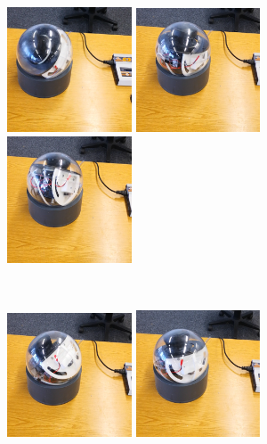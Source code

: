 \begin{figure}
	\centering
	\begin{minipage}[c]{0.45\textwidth}
		\includegraphics[width=0.33\textwidth]{./images/sphere-frame-1.eps}\hfill
		\includegraphics[width=0.33\textwidth]{./images/sphere-frame-2.eps}\hfill
		\includegraphics[width=0.33\textwidth]{./images/sphere-frame-3.eps}\hfill
	\end{minipage}\\
	\begin{minipage}[c]{0.45\textwidth}
		\includegraphics[width=0.33\textwidth]{./images/sphere-frame-4.eps}\hfill
		\includegraphics[width=0.33\textwidth]{./images/sphere-frame-5.eps}\hfill

\end{minipage}
\end{figure}
